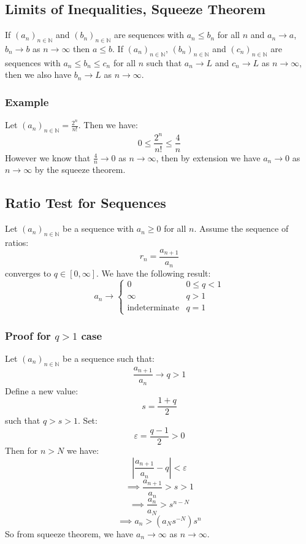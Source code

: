 \documentclass[12pt]{article}
\newcommand{\seq}[2]{(#1_#2)_{#2\in\mathbb{N}}}
\begin{document}
\subsection{Limits of Inequalities, Squeeze Theorem}
If \(\seq{a}{n}\) and \(\seq{b}{n}\) are sequences with \(a_n\leq b_n\) for all \(n\) and \(a_n\to a\), \(b_n\to b\) as \(n\to\infty\) then \(a\leq b\). If \(\seq{a}{n},\,\seq{b}{n}\) and \(\seq{c}{n}\) are sequences with \(a_n\leq b_n\leq c_n\) for all \(n\) such that \(a_n\to L\) and \(c_n\to L\) as \(n\to\infty\), then we also have \(b_n\to L\) as \(n\to \infty\).
\subsubsection*{Example}
Let \(\seq{a}{n}=\frac{2^n}{n!}\). Then we have:
\[0\leq \frac{2^n}{n!}\leq \frac{4}{n}\]
However we know that \(\frac{4}{n}\to 0\) as \(n\to\infty\), then by extension we have \(a_n\to 0\) as \(n\to \infty\) by the squeeze theorem.
\subsection{Ratio Test for Sequences}
Let \(\seq{a}{n}\) be a sequence with \(a_n\geq 0\) for all \(n\). Assume the sequence of ratios:
\[r_n=\frac{a_{n+1}}{a_n}\]
converges to \(q\in[0,\infty]\). We have the following result:
\[a_n\to\begin{cases}
    0 & 0\leq q<1 \\
    \infty & q>1 \\
    \text{indeterminate} & q=1
\end{cases}\]
\subsubsection{Proof for \(q>1\) case}
Let \(\seq{a}{n}\) be a sequence such that:
\[\frac{a_{n+1}}{a_n}\to q>1\]
Define a new value:
\[s=\frac{1+q}{2}\]
such that \(q>s>1\). Set:
\[\varepsilon=\frac{q-1}{2}>0\]
Then for \(n>N\) we have:
\[\left|\frac{a_{n+1}}{a_n}-q\right|<\varepsilon\]
\[\implies \frac{a_{n+1}}{a_n}>s>1\]
\[\implies \frac{a_n}{a_N}>s^{n-N}\]
\[\implies a_n>(a_Ns^{-N})s^n\]
So from squeeze theorem, we have \(a_n\to \infty\) as \(n\to \infty\).
\end{document}
